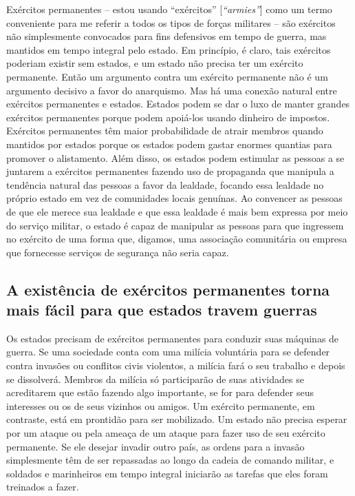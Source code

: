 Exércitos permanentes -- estou usando ``exércitos'' [\emph{``armies''}] como um termo conveniente para me referir a todos os tipos de forças militares -- são exércitos não simplesmente convocados para fins defensivos em tempo de guerra, mas mantidos em tempo integral pelo estado. Em princípio, é claro, tais exércitos poderiam existir sem estados, e um estado não precisa ter um exército permanente. Então um argumento contra um exército permanente não é um argumento decisivo a favor do anarquismo. Mas há uma conexão natural entre exércitos permanentes e estados. Estados podem se dar o luxo de manter grandes exércitos permanentes porque podem apoiá-los usando dinheiro de impostos. Exércitos permanentes têm maior probabilidade de atrair membros quando mantidos por estados porque os estados podem gastar enormes quantias para promover o alistamento. Além disso, os estados podem estimular as pessoas a se juntarem a exércitos permanentes fazendo uso de propaganda que manipula a tendência natural das pessoas a favor da lealdade, focando essa lealdade no próprio estado em vez de comunidades locais genuínas. Ao convencer as pessoas de que ele merece sua lealdade e que essa lealdade é mais bem expressa por meio do serviço militar, o estado é capaz de manipular as pessoas para que ingressem no exército de uma forma que, digamos, uma associação comunitária ou empresa que fornecesse serviços de segurança não seria capaz.

\subsection*{A existência de exércitos permanentes torna mais fácil para que estados travem guerras}

Os estados precisam de exércitos permanentes para conduzir suas máquinas de guerra. Se uma sociedade conta com uma milícia voluntária para se defender contra invasões ou conflitos civis violentos, a milícia fará o seu trabalho e depois se dissolverá. Membros da milícia só participarão de suas atividades se acreditarem que estão fazendo algo importante, se for para defender seus interesses ou os de seus vizinhos ou amigos. Um exército permanente, em contraste, está em prontidão para ser mobilizado. Um estado não precisa esperar por um ataque ou pela ameaça de um ataque para fazer uso de seu exército permanente. Se ele desejar invadir outro país, as ordens para a invasão simplesmente têm de ser repassadas ao longo da cadeia de comando militar, e soldados e marinheiros em tempo integral iniciarão as tarefas que eles foram treinados a fazer.

